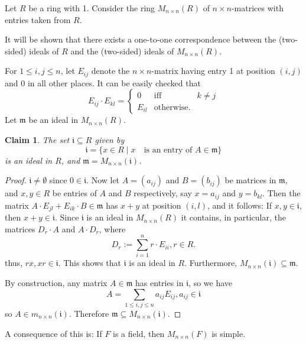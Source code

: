 \documentclass[12pt]{article}
\newtheorem*{claim}{Claim}
\begin{document}
Let $R$ be a ring with 1. Consider the ring $M_{n \times n}(R)$ of $n \times n$-matrices with entries taken from $R$.

It will be shown that there exists a one-to-one 
correspondence between the (two-sided) ideals of $R$ and the 
(two-sided) ideals of $M_{n \times n}(R)$.

For $1 \le i,j \le n$, let $E_{ij}$ denote the $n 
\times n$-matrix having entry 1 at position 
$(i,j)$ and 0 in all other places. It can be 
easily checked that
\begin{equation}
E_{ij} \cdot E_{kl}=\left\{
\begin{array}{lllll}
0 & \mbox{iff}& k \ne j \\
E_{il} & \mbox{otherwise.}
\end{array}\right.
\end{equation}
Let $\mathfrak{m}$ be an ideal in $M_{n \times 
n}(R)$.
\begin{claim}
The set $\mathfrak{i}\subseteq R$ given by
\[\mathfrak{i}=\{x \in R \mid x\quad\mbox{is an entry 
of } A \in \mathfrak{m}\}\]
is an ideal in $R$, and 
$\mathfrak{m}=M_{n \times n}(\mathfrak{i})$.
\end{claim}
\begin{proof}
$\mathfrak{i} \ne \emptyset$ since $0 \in 
\mathfrak{i}$. Now let $A=(a_{ij})$ and $B=(b_{ij})$ 
be matrices in $\mathfrak{m}$, and $x,y \in R$ be 
entries of $A$ and $B$ respectively, say 
$x=a_{ij}$ and $y=b_{kl}$. Then the matrix $A \cdot 
E_{jl} +E_{ik}\cdot B \in \mathfrak{m}$ has $x+y$ 
at position $(i,l)$, and it follows: If $x,y \in 
\mathfrak{i}$, then $x+y \in \mathfrak{i}$. Since 
$\mathfrak{i}$ is an ideal in $M_{n \times n}(R)$ 
it contains, in particular, the matrices $D_r \cdot A$ and $A \cdot D_r$, where 
\begin{equation*}
D_r :=\sum_{i=1}^n r\cdot E_{ii}, r \in R.
\end{equation*}
thus, $rx, xr \in \mathfrak{i}$. This shows 
that $\mathfrak{i}$ is an ideal in $R$. 
Furthermore, $M_{n \times n}(\mathfrak{i}) 
\subseteq \mathfrak{m}$.

By construction, any matrix $A \in \mathfrak{m}$ 
has entries in $\mathfrak{i}$, so we have
\begin{equation*}
A=\sum\limits_{1 \le i,j \le n} a_{ij}E_{ij}, 
a_{ij} \in \mathfrak{i}
\end{equation*}
so $A \in m_{n \times n}(\mathfrak{i})$. Therefore 
$\mathfrak{m} \subseteq M_{n \times n}(\mathfrak{i})$.
\end{proof}
A consequence of this is: If $F$ is a field, then $M_{n \times n}(F)$ is simple.
\end{document}
